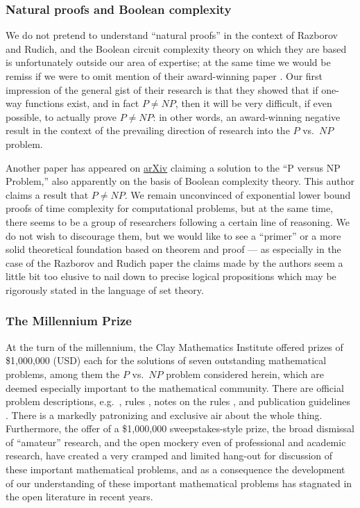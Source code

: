 \documentclass[letterpaper]{article}
\begin{document}
\subsubsection{Natural proofs and Boolean complexity}
We do not pretend to understand ``natural proofs'' in the context of Razborov and Rudich, and the Boolean circuit complexity theory on which they are based is unfortunately outside our area of expertise; at the same time we would be remiss if we were to omit mention of their award-winning \cite{kehoe2007prize} paper \cite{razborov1997natural}.  Our first impression of the general gist of their research is that they showed that if one-way functions exist, and in fact $P\ne NP$, then it will be very difficult, if even possible, to actually prove $P\ne NP$: in other words, an award-winning negative result in the context of the prevailing direction of research into the $P$ vs.\ $NP$ problem.

Another paper \cite{blum2017} has appeared on \href{https://arxiv.org/}{arXiv} claiming a solution to the ``P versus NP Problem,'' also apparently on the basis of Boolean complexity theory. This author claims a result that \mbox{$P\ne NP$}. We remain unconvinced of exponential lower bound proofs of time complexity for computational problems, but at the same time, there seems to be a group of researchers following a certain line of reasoning. We do not wish to discourage them, but we would like to see a ``primer'' or a more solid theoretical foundation based on theorem and proof --- as especially in the case of the Razborov and Rudich paper \cite{razborov1997natural} the claims made by the authors seem a little bit too elusive to nail down to precise logical propositions which may be rigorously stated in the language of set theory.

\subsubsection{The Millennium Prize}
At the turn of the millennium, the Clay Mathematics Institute \cite{claymath} offered prizes \cite{claymath-millenium-prize} of \$1,000,000 (USD) each for the solutions of seven outstanding mathematical problems, among them the $P$ vs.\ $NP$ problem considered herein, which are deemed especially important to the mathematical community.  There are official problem descriptions, e.g.~\cite{claymath-pnp-problem-description}, rules \cite{claymath-millennium-prize-rules}, notes on the rules \cite{claymath-notes-on-rules}, and publication guidelines \cite{claymath-publication-guidelines}. There is a markedly patronizing and exclusive air about the whole thing.  Furthermore, the offer of a \$1,000,000 sweepstakes-style prize, the broad dismissal of ``amateur'' research, and the open mockery even of professional and academic research, have created a very cramped and limited hang-out for discussion of these important mathematical problems, and as a consequence the development of our understanding of these important mathematical problems has stagnated in the open literature in recent years.
\end{document}
